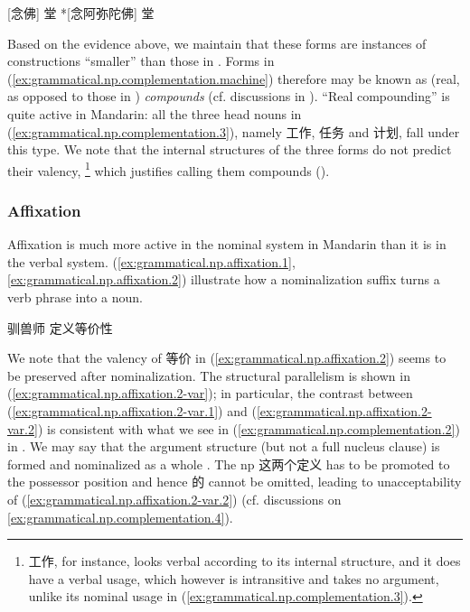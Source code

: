 \documentclass[UTF8, a4paper, oneside, scheme=plain, 12pt]{ctexrep}
\newcommand*{\term}[1]{\emph{#1}}
\begin{document}
\begin{exe}
    \ex\label{ex:grammatical.np.compounding.chant-buddha}
    \begin{xlist}
        \ex\label{ex:grammatical.np.compounding.chant-buddha.1} {} [念佛] 堂 
        \ex\label{ex:grammatical.np.compounding.chant-buddha.2} {} *[念阿弥陀佛] 堂 
    \end{xlist}
\end{exe}

Based on the evidence above, we maintain that these forms are instances
of constructions ``smaller'' than those in .
Forms in (\ref{ex:grammatical.np.complementation.machine})
therefore may be known as (real, as opposed to those in ) \term{compounds}
(cf. discussions in ).
``Real compounding'' is quite active in Mandarin:
all the three head nouns in (\ref{ex:grammatical.np.complementation.3}),
namely 工作, 任务 and 计划, fall under this type.
We note that the internal structures of the three forms do not predict their valency,%
\footnote{
    工作, for instance, looks verbal according to its internal structure,
    and it does have a verbal usage, which however is intransitive
    and takes no argument, unlike its nominal usage in (\ref{ex:grammatical.np.complementation.3}).
}
which justifies calling them compounds ().

\subsubsection{Affixation}

Affixation is much more active in the nominal system in Mandarin
than it is in the verbal system.
(\ref{ex:grammatical.np.affixation.1}, \ref{ex:grammatical.np.affixation.2})
illustrate how a nominalization suffix turns a verb phrase into a noun.

\begin{exe}
    \ex\label{ex:grammatical.np.affixation.1} 驯兽师
    \ex\label{ex:grammatical.np.affixation.2} 定义等价性
\end{exe}

We note that the valency of 等价 in (\ref{ex:grammatical.np.affixation.2})
seems to be preserved after nominalization.
The structural parallelism is shown in (\ref{ex:grammatical.np.affixation.2-var});
in particular, the contrast between (\ref{ex:grammatical.np.affixation.2-var.1})
and (\ref{ex:grammatical.np.affixation.2-var.2})
is consistent with what we see in (\ref{ex:grammatical.np.complementation.2}) in 
.
We may say that the argument structure (but not a full nucleus clause) is formed and nominalized as a whole
\citep{kornfilt2011afterword}.
The \ac{np} 这两个定义 has to be promoted to the possessor position
and hence 的 cannot be omitted, leading to unacceptability of (\ref{ex:grammatical.np.affixation.2-var.2})
(cf. discussions on \ref{ex:grammatical.np.complementation.4}).
\end{document}
